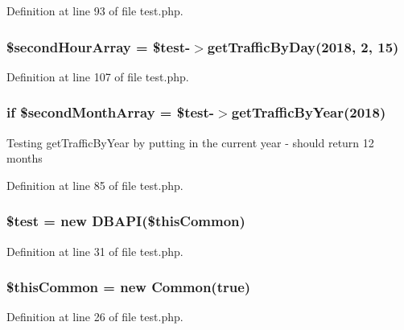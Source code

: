 Definition at line 93 of file test.\+php.

\subsubsection[{\$second\+Hour\+Array}]{\setlength{\rightskip}{0pt plus 5cm}\$second\+Hour\+Array = \$test-\/$>$get\+Traffic\+By\+Day(2018, 2, 15)}\label{test_8php_a1d19ca72f1f9b19ab4d0107dec987a79}


Definition at line 107 of file test.\+php.

\subsubsection[{\$second\+Month\+Array}]{\setlength{\rightskip}{0pt plus 5cm}if \$second\+Month\+Array = \$test-\/$>$get\+Traffic\+By\+Year(2018)}\label{test_8php_a056500060fa87796ceb5c1d9c6e1502e}
Testing get\+Traffic\+By\+Year by putting in the current year -\/ should return 12 months 

Definition at line 85 of file test.\+php.

\subsubsection[{\$test}]{\setlength{\rightskip}{0pt plus 5cm}\$test = new {\bf D\+B\+A\+PI}(\$this\+Common)}\label{test_8php_a31daebf88fc668f410293e2c70cea3fc}


Definition at line 31 of file test.\+php.

\subsubsection[{\$this\+Common}]{\setlength{\rightskip}{0pt plus 5cm}\$this\+Common = new {\bf Common}(true)}\label{test_8php_a2dc37683cec5a169d791007363950944}


Definition at line 26 of file test.\+php.

